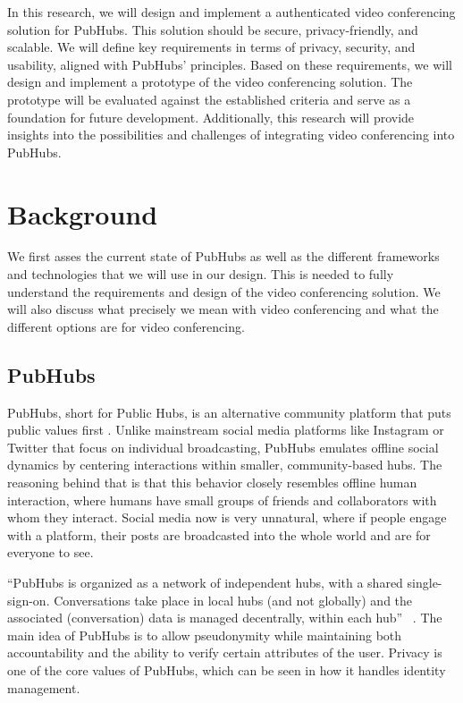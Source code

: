 \documentclass{report}
\begin{document}
In this research, we will design and implement a authenticated video conferencing solution for PubHubs. This
solution should be secure, privacy-friendly, and scalable. We will define key requirements in terms of privacy,
security, and usability, aligned with PubHubs’ principles. Based on these requirements, we will design and implement
a prototype of the video conferencing solution. The prototype will be evaluated against the established criteria and
serve as a foundation for future development. Additionally, this research will provide insights into the
possibilities and challenges of integrating video conferencing into PubHubs.



\chapter{Background}
We first asses the current state of PubHubs as well as the different frameworks and technologies that we will use in
our design. This is needed to fully understand the requirements and design of the video conferencing solution. We
will also discuss what precisely we mean with video conferencing and what the different options are for video
conferencing.

\section{PubHubs}
PubHubs, short for Public Hubs, is an alternative community platform that puts public values first
\cite{jacobs_pubhubs_2023}. Unlike mainstream social media platforms like Instagram or Twitter that focus on
individual broadcasting, PubHubs emulates offline social dynamics by centering interactions within smaller,
community-based hubs. The reasoning
behind that is that this behavior closely resembles offline human interaction, where humans have small groups of
friends and collaborators with whom they interact. Social media now is very unnatural, where if people engage with a
platform, their posts are broadcasted into the whole world and are for everyone to see.

“PubHubs is organized as a network of independent hubs, with a shared single-sign-on. Conversations take place in
local hubs (and not globally) and the associated (conversation) data is managed decentrally, within each hub”~
\cite{jacobs_pubhubs_2023}. The main idea of PubHubs is to allow pseudonymity while maintaining both accountability
and the ability to verify certain attributes of the user. Privacy is one of the core values of PubHubs, which can be
seen in how it handles identity management.
\end{document}
